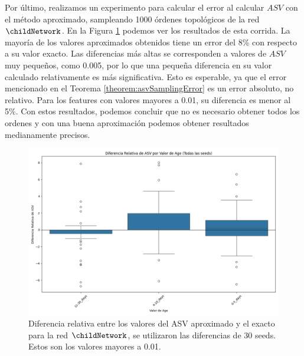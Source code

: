 Por último, realizamos un experimento para calcular el error al calcular $ASV$ con el método aproximado, sampleando 1000 órdenes topológicos de la red $\childNetwork$. En la Figura \ref{fig:boxplotASVApproximateDifferences} podemos ver los resultados de esta corrida. La mayoría de los valores aproximados obtenidos tiene un error del 8\% con respecto a su valor exacto. Las diferencias más altas se corresponden a valores de $ASV$ muy pequeños, como 0.005, por lo que una pequeña diferencia en su valor calculado relativamente es más significativa. Esto es esperable, ya que el error mencionado en el Teorema \ref{theorem:asvSamplingError} es un error absoluto, no relativo. Para los features con valores mayores a 0.01, su diferencia es menor al 5\%.
Con estos resultados, podemos concluir que no es necesario obtener todos los ordenes y con una buena aproximación podemos obtener resultados medianamente precisos. 


\begin{figure}
    \centering
    \includegraphics[width=0.8\linewidth]{img/asvResults/ChildAllSeedsASVBoxplot.png}
    \caption{Diferencia relativa entre los valores del ASV aproximado y el exacto para la red $\childNetwork$, se utilizaron las diferencias de 30 seeds. Estos son los valores mayores a 0.01.}
    \label{fig:boxplotASVApproximateDifferences}
\end{figure}


